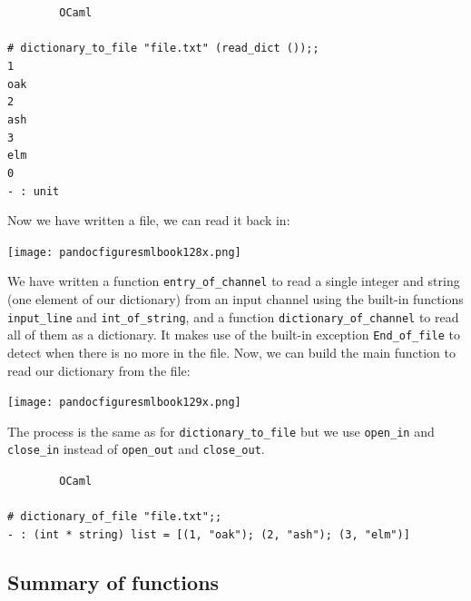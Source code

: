 \documentclass[]{book}
\newcommand{\smspace}{\vspace{4mm}}
\begin{document}
\smspace
\noindent\verb!        OCaml!\\
\noindent\\
\noindent\verb!# dictionary_to_file "file.txt" (read_dict ());;!\\
\noindent\verb!1!\\
\noindent\verb!oak!\\
\noindent\verb!2!\\
\noindent\verb!ash!\\
\noindent\verb!3!\\
\noindent\verb!elm!\\
\noindent\verb!0!\\
\noindent\verb!- : unit!
\smspace

\noindent Now we have written a file, we can read it back in:

\medskip
\begin{center}
\noindent\texttt{[image: pandocfiguresmlbook128x.png]}
\end{center}
\medskip

\noindent We have written a function \texttt{entry\_of\_channel} to read a single integer and string (one element of our dictionary) from an input channel using the built-in functions \texttt{input\_line} and \texttt{int\_of\_string}, and a function \texttt{dictionary\_of\_channel} to read all of them as a dictionary. It makes use of the built-in exception \texttt{End\_of\_file} to detect when there is no more in the file. Now, we can build the main function to read our dictionary from the file:

\medskip
\begin{center}
\noindent\texttt{[image: pandocfiguresmlbook129x.png]}
\end{center}
\medskip

{\begin{sloppypar}
\noindent The process is the same as for \texttt{dictionary\_to\_file} but we use \texttt{open\_in} and \texttt{close\_in} instead of \texttt{open\_out} and \texttt{close\_out}.
\end{sloppypar}}

\smspace
\noindent\verb!        OCaml!\\
\noindent\\
\noindent\verb!# dictionary_of_file "file.txt";;!\\
\noindent\verb!- : (int * string) list = [(1, "oak"); (2, "ash"); (3, "elm")]!

\subsection*{Summary of functions}
\end{document}
